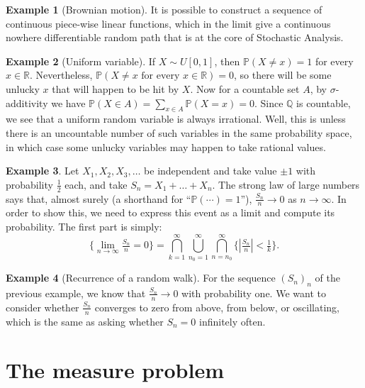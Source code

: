 \documentclass[
]{book}
\newcommand{\Pb}{\mathbb{P}}
\newcommand{\Q}{\mathbb{Q}}
\newcommand{\R}{\mathbb{R}}
\renewcommand*{\geq}{\geqslant}
\theoremstyle{definition}
\theoremstyle{definition}
\newtheorem{example}{Example}[chapter]
\theoremstyle{definition}
\theoremstyle{definition}
\theoremstyle{remark}
\begin{document}
\begin{example}[Brownian motion]
It is possible to construct a sequence of continuous piece-wise linear
functions, which in the limit give a continuous nowhere differentiable
random path that is at the core of Stochastic Analysis.
\end{example}

\begin{example}[Uniform variable]
If \(X \sim U[0,1]\), then \(\Pb(X \ne x) = 1\) for every \(x \in \R\).
Nevertheless, \(\Pb(X \ne x \text{ for every } x \in \R ) = 0\), so there
will be some unlucky \(x\) that will happen to be hit by \(X\). Now for a
countable set \(A\), by \(\sigma\)-additivity we have
\(\Pb(X \in A) = \sum_{x \in A} \Pb(X=x) = 0\). Since \(\Q\) is countable,
we see that a uniform random variable is always irrational. Well, this
is unless there is an uncountable number of such variables in the same
probability space, in which case some unlucky variables may happen to
take rational values.
\end{example}

\begin{example}
Let \(X_1,X_2,X_3,\dots\) be independent and take value \(\pm 1\) with
probability \(\frac{1}{2}\) each, and take \(S_n = X_1 + \dots + X_n\). The
strong law of large numbers says that, almost surely (a shorthand for
``\(\Pb(\cdots)=1\)''), \(\frac{S_n}{n} \to 0\) as \(n \to \infty\). In order to
show this, we need to express this event as a limit and compute its
probability. The first part is simply:
\[\{\lim_{n \to \infty} \tfrac{S_n}{n} = 0\}
=
\bigcap_{k=1}^\infty
\bigcup_{n_0=1}^\infty
\bigcap_{n=n_0}^\infty
\{|\tfrac{S_n}{n}| < \tfrac{1}{k} \}
.\]
\end{example}

\begin{example}[Recurrence of a random walk]
For the sequence \((S_n)_n\) of the previous example, we know that
\(\frac{S_n}{n} \to 0\) with probability one. We want to consider whether
\(\frac{S_n}{n}\) converges to zero from above, from below, or
oscillating, which is the same as asking whether \(S_n=0\) infinitely
often.
\end{example}

\hypertarget{sub:measureproblem}{%
\section{The measure problem}\label{sub:measureproblem}}
\end{document}
